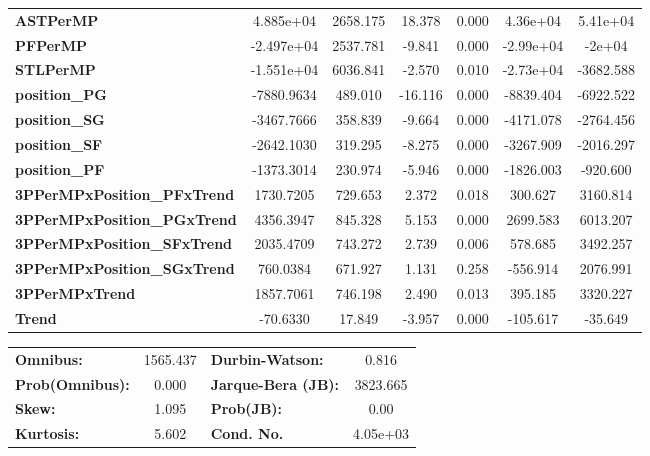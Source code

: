 \begin{center}
\begin{tabular}{lcccccc}
\textbf{ASTPerMP}                   &    4.885e+04  &     2658.175     &    18.378  &         0.000        &     4.36e+04    &     5.41e+04     \\
\textbf{PFPerMP}                    &   -2.497e+04  &     2537.781     &    -9.841  &         0.000        &    -2.99e+04    &       -2e+04     \\
\textbf{STLPerMP}                   &   -1.551e+04  &     6036.841     &    -2.570  &         0.010        &    -2.73e+04    &    -3682.588     \\
\textbf{position\_PG}               &   -7880.9634  &      489.010     &   -16.116  &         0.000        &    -8839.404    &    -6922.522     \\
\textbf{position\_SG}               &   -3467.7666  &      358.839     &    -9.664  &         0.000        &    -4171.078    &    -2764.456     \\
\textbf{position\_SF}               &   -2642.1030  &      319.295     &    -8.275  &         0.000        &    -3267.909    &    -2016.297     \\
\textbf{position\_PF}               &   -1373.3014  &      230.974     &    -5.946  &         0.000        &    -1826.003    &     -920.600     \\
\textbf{3PPerMPxPosition\_PFxTrend} &    1730.7205  &      729.653     &     2.372  &         0.018        &      300.627    &     3160.814     \\
\textbf{3PPerMPxPosition\_PGxTrend} &    4356.3947  &      845.328     &     5.153  &         0.000        &     2699.583    &     6013.207     \\
\textbf{3PPerMPxPosition\_SFxTrend} &    2035.4709  &      743.272     &     2.739  &         0.006        &      578.685    &     3492.257     \\
\textbf{3PPerMPxPosition\_SGxTrend} &     760.0384  &      671.927     &     1.131  &         0.258        &     -556.914    &     2076.991     \\
\textbf{3PPerMPxTrend}              &    1857.7061  &      746.198     &     2.490  &         0.013        &      395.185    &     3320.227     \\
\textbf{Trend}                      &     -70.6330  &       17.849     &    -3.957  &         0.000        &     -105.617    &      -35.649     \\
\bottomrule
\end{tabular}
\begin{tabular}{lclc}
\textbf{Omnibus:}       & 1565.437 & \textbf{  Durbin-Watson:     } &    0.816  \\
\textbf{Prob(Omnibus):} &   0.000  & \textbf{  Jarque-Bera (JB):  } & 3823.665  \\
\textbf{Skew:}          &   1.095  & \textbf{  Prob(JB):          } &     0.00  \\
\textbf{Kurtosis:}      &   5.602  & \textbf{  Cond. No.          } & 4.05e+03  \\
\bottomrule
\end{tabular}
\end{center}

